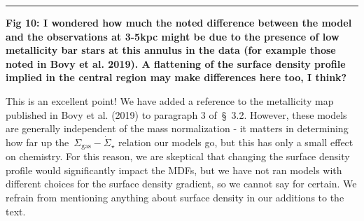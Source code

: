 \documentclass{report}
\newcommand{\breakline}{\noindent\rule{\textwidth}{1pt}}
\begin{document}
\par\null\par 
\breakline 
\par\null\par 
\textbf{
	Fig 10: I wondered how much the noted difference between the model and the 
	observations at 3-5kpc might be due to the presence of low metallicity bar 
	stars at this annulus in the data (for example those noted in Bovy et al. 
	2019). 
	A flattening of the surface density profile implied in the central region 
	may make differences here too, I think?
} 
\par 
This is an excellent point! 
We have added a reference to the metallicity map published in Bovy et al. 
(2019) to paragraph 3 of~\S~3.2. 
However, these models are generally independent of the mass normalization - it 
matters in determining how far up the~$\Sigma_\text{gas}-\dot{\Sigma}_\star$ 
relation our models go, but this has only a small effect on chemistry. 
For this reason, we are skeptical that changing the surface density profile 
would significantly impact the MDFs, but we have not ran models with different 
choices for the surface density gradient, so we cannot say for certain. 
We refrain from mentioning anything about surface density in our additions 
to the text. 
\end{document}
